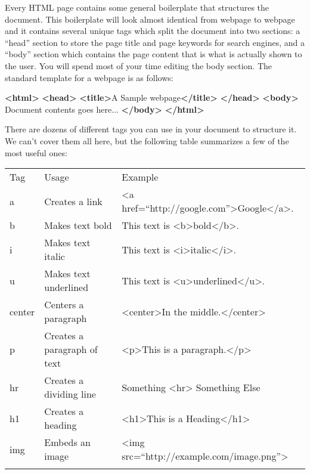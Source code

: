 \documentclass[]{memoir}
\newenvironment{Shaded}{}{}
\newcommand{\KeywordTok}[1]{\textcolor[rgb]{0.00,0.44,0.13}{\textbf{{#1}}}}
\newcommand{\NormalTok}[1]{{#1}}
\begin{document}
Every HTML page contains some general boilerplate that structures the
document. This boilerplate will look almost identical from webpage to
webpage and it contains several unique tags which split the document
into two sections: a ``head'' section to store the page title and page
keywords for search engines, and a ``body'' section which contains the
page content that is what is actually shown to the user. You will spend
most of your time editing the body section. The standard template for a
webpage is as follows:

\begin{Shaded}
\begin{Highlighting}[]
\KeywordTok{<html>}
\KeywordTok{<head>}
    \KeywordTok{<title>}\NormalTok{A Sample webpage}\KeywordTok{</title>}
\KeywordTok{</head>}
\KeywordTok{<body>}
    \NormalTok{Document contents goes here...}
\KeywordTok{</body>}
\KeywordTok{</html>}
\end{Highlighting}
\end{Shaded}

There are dozens of different tags you can use in your document to
structure it. We can't cover them all here, but the following table
summarizes a few of the most useful ones:

\begin{longtable}[c]{@{}lll@{}}
\hline\noalign{\medskip}
Tag & Usage & Example
\\\noalign{\medskip}
\hline\noalign{\medskip}
a & Creates a link & \textless{}a
href=``http://google.com''\textgreater{}Google\textless{}/a\textgreater{}.
\\\noalign{\medskip}
b & Makes text bold & This text is
\textless{}b\textgreater{}bold\textless{}/b\textgreater{}.
\\\noalign{\medskip}
i & Makes text italic & This text is
\textless{}i\textgreater{}italic\textless{}/i\textgreater{}.
\\\noalign{\medskip}
u & Makes text underlined & This text is
\textless{}u\textgreater{}underlined\textless{}/u\textgreater{}.
\\\noalign{\medskip}
center & Centers a paragraph & \textless{}center\textgreater{}In the
middle.\textless{}/center\textgreater{}
\\\noalign{\medskip}
p & Creates a paragraph of text & \textless{}p\textgreater{}This is a
paragraph.\textless{}/p\textgreater{}
\\\noalign{\medskip}
hr & Creates a dividing line & Something \textless{}hr\textgreater{}
Something Else
\\\noalign{\medskip}
h1 & Creates a heading & \textless{}h1\textgreater{}This is a
Heading\textless{}/h1\textgreater{}
\\\noalign{\medskip}
img & Embeds an image & \textless{}img
src=``http://example.com/image.png''\textgreater{}
\\\noalign{\medskip}
\hline
\end{longtable}
\end{document}
